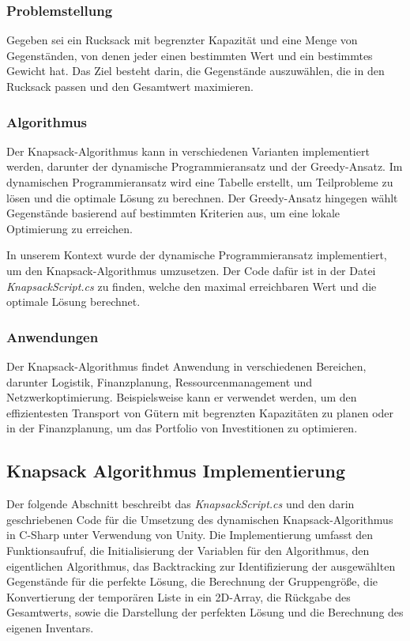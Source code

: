 \subsubsection{Problemstellung}
Gegeben sei ein Rucksack mit begrenzter Kapazität und eine Menge von Gegenständen, von denen jeder einen bestimmten
Wert und ein bestimmtes Gewicht hat. Das Ziel besteht darin, die Gegenstände auszuwählen, die in den Rucksack passen
und den Gesamtwert maximieren.

\subsubsection{Algorithmus}
Der Knapsack-Algorithmus kann in verschiedenen Varianten implementiert werden, darunter der dynamische
Programmieransatz und der Greedy-Ansatz. Im dynamischen Programmieransatz wird eine Tabelle erstellt, um
Teilprobleme zu lösen und die optimale Lösung zu berechnen. Der Greedy-Ansatz hingegen wählt Gegenstände basierend
auf bestimmten Kriterien aus, um eine lokale Optimierung zu erreichen.

In unserem Kontext wurde der dynamische Programmieransatz implementiert, um den Knapsack-Algorithmus umzusetzen.
Der Code dafür ist in der Datei \textit{KnapsackScript.cs} zu finden, welche den maximal erreichbaren Wert und
die optimale Lösung berechnet.

\subsubsection{Anwendungen}
Der Knapsack-Algorithmus findet Anwendung in verschiedenen Bereichen, darunter Logistik, Finanzplanung,
Ressourcenmanagement und Netzwerkoptimierung. Beispielsweise kann er verwendet werden, um den effizientesten
Transport von Gütern mit begrenzten Kapazitäten zu planen oder in der Finanzplanung, um das Portfolio von
Investitionen zu optimieren.

\subsection{Knapsack Algorithmus Implementierung}
Der folgende Abschnitt beschreibt das \textit{KnapsackScript.cs} und den darin geschriebenen Code für die Umsetzung des
dynamischen Knapsack-Algorithmus in C-Sharp unter Verwendung von Unity. Die Implementierung umfasst den Funktionsaufruf, die
Initialisierung der Variablen für den Algorithmus, den eigentlichen Algorithmus, das Backtracking zur
Identifizierung der ausgewählten Gegenstände für die perfekte Lösung, die Berechnung der Gruppengröße, die Konvertierung
der temporären Liste in ein 2D-Array, die Rückgabe des Gesamtwerts, sowie die Darstellung der perfekten Lösung und die
Berechnung des eigenen Inventars.

